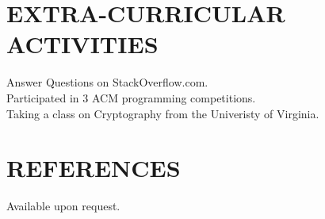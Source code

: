 \documentclass[line]{res}
\begin{document}
\begin{resume}
\section{EXTRA-CURRICULAR ACTIVITIES}
	Answer Questions on StackOverflow.com.\\
	Participated in 3 ACM programming competitions.\\
	Taking a class on Cryptography from the Univeristy of Virginia.

\section{REFERENCES} Available upon request.
\end{resume}
\end{document}
